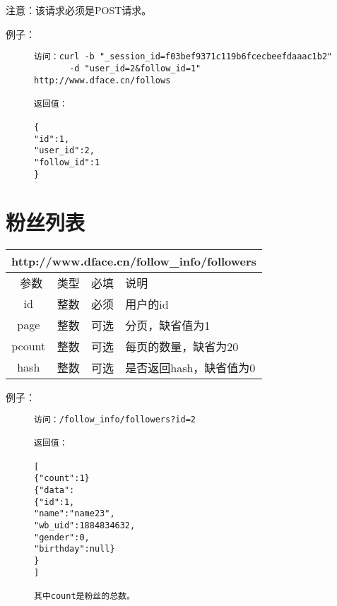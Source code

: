 \documentclass[cs4size]{ctexartutf8}
\begin{document}
注意：该请求必须是POST请求。

例子：

\begin{figure}[H]
\begin{verbatim}
访问：curl -b "_session_id=f03bef9371c119b6fcecbeefdaaac1b2"
       -d "user_id=2&follow_id=1" http://www.dface.cn/follows

返回值：

{
"id":1,
"user_id":2,
"follow_id":1
}

\end{verbatim}
\end{figure}



\section{粉丝列表}

\begin{table}[H]
   \begin{center}
\begin{tabular}{|c|c|c|p{12cm}|}
\hline
\multicolumn{4}{|c|}{http://www.dface.cn/follow\_info/followers} \\
\hline\hline
 \  参数  & 类型 & 必填 &  说明  \\
\hline
 id  & 整数 & 必须 & 用户的id\\
   \hline
 page  & 整数 & 可选 & 分页，缺省值为1\\ 
 \hline
 pcount  & 整数 & 可选 & 每页的数量，缺省为20\\ 
    \hline
 hash  & 整数 & 可选 & 是否返回hash，缺省值为0\\ 
\hline

\end{tabular}
   \end{center}
\end{table}

例子：

\begin{figure}[H]
\begin{verbatim}
访问：/follow_info/followers?id=2

返回值：

[
{"count":1}
{"data":
{"id":1,
"name":"name23",
"wb_uid":1884834632,
"gender":0,
"birthday":null}
}
]

其中count是粉丝的总数。

\end{verbatim}
\end{figure}
\end{document}
